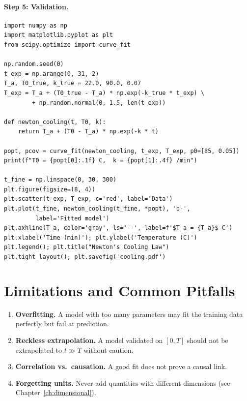 \paragraph{Step 5: Validation.}

\begin{codeblock}[title=\textbf{Simulation and fit --- cooling}]
\begin{verbatim}
import numpy as np
import matplotlib.pyplot as plt
from scipy.optimize import curve_fit

np.random.seed(0)
t_exp = np.arange(0, 31, 2)
T_a, T0_true, k_true = 22.0, 90.0, 0.07
T_exp = T_a + (T0_true - T_a) * np.exp(-k_true * t_exp) \
        + np.random.normal(0, 1.5, len(t_exp))

def newton_cooling(t, T0, k):
    return T_a + (T0 - T_a) * np.exp(-k * t)

popt, pcov = curve_fit(newton_cooling, t_exp, T_exp, p0=[85, 0.05])
print(f"T0 = {popt[0]:.1f} C,  k = {popt[1]:.4f} /min")

t_fine = np.linspace(0, 30, 300)
plt.figure(figsize=(8, 4))
plt.scatter(t_exp, T_exp, c='red', label='Data')
plt.plot(t_fine, newton_cooling(t_fine, *popt), 'b-',
         label='Fitted model')
plt.axhline(T_a, color='gray', ls='--', label=f'$T_a = {T_a}$ C')
plt.xlabel('Time (min)'); plt.ylabel('Temperature (C)')
plt.legend(); plt.title("Newton's Cooling Law")
plt.tight_layout(); plt.savefig('cooling.pdf')
\end{verbatim}
\end{codeblock}

\section{Limitations and Common Pitfalls}

\begin{warning}[title=\textbf{Pitfalls to avoid}]
\begin{enumerate}
  \item \textbf{Overfitting.}
    A model with too many parameters may fit the training data
    perfectly but fail at prediction.
  \item \textbf{Reckless extrapolation.}
    A model validated on $[0,T]$ should not be extrapolated to
    $t\gg T$ without caution.
  \item \textbf{Correlation vs.\ causation.}
    A good fit does not prove a causal link.
  \item \textbf{Forgetting units.}
    Never add quantities with different dimensions
    (see Chapter~\ref{ch:dimensional}).
\end{enumerate}
\end{warning}

